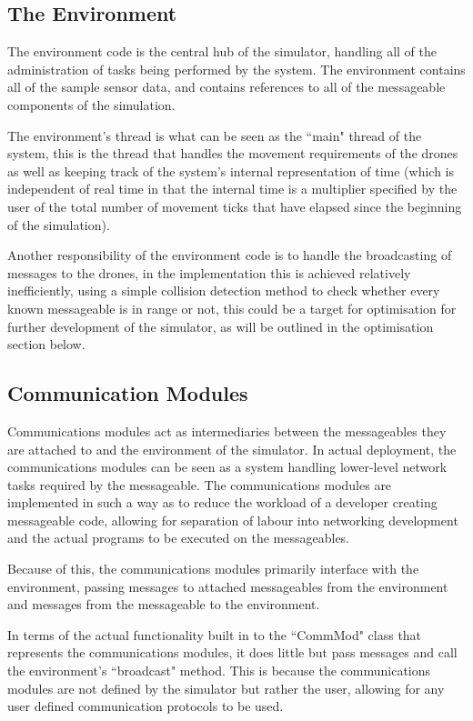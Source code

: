 \subsection{The Environment}
		The environment code is the central hub of the simulator, handling all of the administration
		of tasks being performed by the system. The environment contains all of the sample sensor
		data, and contains references to all of the messageable components of the simulation.

		The environment's thread is what can be seen as the ``main" thread of the system, this is the
		thread that handles the movement requirements of the drones as well as keeping track of the
		system's internal representation of time (which is independent of real time in that
		the internal time is a multiplier specified by the user of the total number of movement ticks
		that have elapsed since the beginning of the simulation).

		Another responsibility of the environment code is to handle the broadcasting of messages to
		the drones, in the implementation this is achieved relatively inefficiently, using a simple collision detection
		method to check whether every known messageable is in range or not, this could be a target
		for optimisation for further development of the simulator, as will be outlined in the optimisation
		section below.

\subsection{Communication Modules}
		Communications modules act as intermediaries between the messageables they are attached to and
		the environment of the simulator. In actual deployment, the communications modules can be seen as a system
		handling lower-level network tasks required by the messageable. The communications modules are implemented
		in such a way as to reduce the workload of a developer creating messageable code, allowing for separation
		of labour into networking development and the actual programs to be executed on the messageables.

		Because of this, the communications modules primarily interface with the environment, passing messages
		to attached messageables from the environment and messages from the messageable to the environment.

		In terms of the actual functionality built in to the ``CommMod" class that represents the communications
		modules, it does little but pass messages and call the environment's ``broadcast" method. This is because
		the communications modules are not defined by the simulator but rather the user, allowing for any user defined
		communication protocols to be used.


